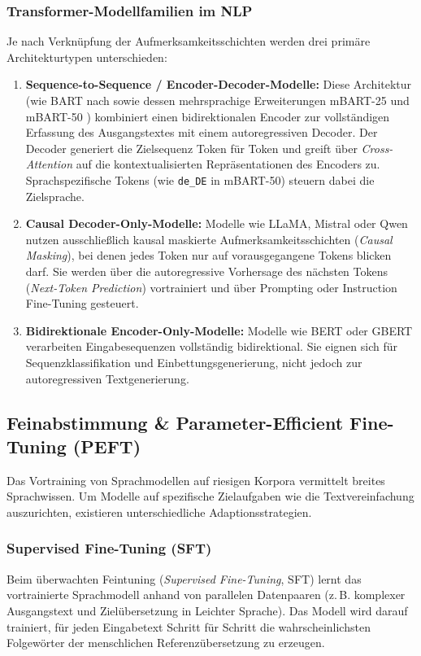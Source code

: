 \subsubsection{Transformer-Modellfamilien im NLP}
Je nach Verknüpfung der Aufmerksamkeitsschichten werden drei primäre Architekturtypen unterschieden:
\begin{enumerate}
    \item \textbf{Sequence-to-Sequence / Encoder-Decoder-Modelle:} Diese Architektur (wie BART nach \citet{lewis2020bart} sowie dessen mehrsprachige Erweiterungen mBART-25 \citep{liu2020multilingual} und mBART-50 \citep{tang2020multilingual}) kombiniert einen bidirektionalen Encoder zur vollständigen Erfassung des Ausgangstextes mit einem autoregressiven Decoder. Der Decoder generiert die Zielsequenz Token für Token und greift über \textit{Cross-Attention} auf die kontextualisierten Repräsentationen des Encoders zu. Sprachspezifische Tokens (wie \texttt{de\_DE} in mBART-50) steuern dabei die Zielsprache.
    \item \textbf{Causal Decoder-Only-Modelle:} Modelle wie LLaMA, Mistral oder Qwen nutzen ausschließlich kausal maskierte Aufmerksamkeitsschichten (\textit{Causal Masking}), bei denen jedes Token nur auf vorausgegangene Tokens blicken darf. Sie werden über die autoregressive Vorhersage des nächsten Tokens (\textit{Next-Token Prediction}) vortrainiert und über Prompting oder Instruction Fine-Tuning gesteuert.
    \item \textbf{Bidirektionale Encoder-Only-Modelle:} Modelle wie BERT \citep{devlin2019bert} oder GBERT verarbeiten Eingabesequenzen vollständig bidirektional. Sie eignen sich für Sequenzklassifikation und Einbettungsgenerierung, nicht jedoch zur autoregressiven Textgenerierung.
\end{enumerate}

\subsection{Feinabstimmung \& Parameter-Efficient Fine-Tuning (PEFT)}
\label{sec:peft_lora_theorie}

Das Vortraining von Sprachmodellen auf riesigen Korpora vermittelt breites Sprachwissen. Um Modelle auf spezifische Zielaufgaben wie die Textvereinfachung auszurichten, existieren unterschiedliche Adaptionsstrategien.

\subsubsection{Supervised Fine-Tuning (SFT)}
Beim überwachten Feintuning (\textit{Supervised Fine-Tuning}, SFT) lernt das vortrainierte Sprachmodell anhand von parallelen Datenpaaren (z.\,B. komplexer Ausgangstext und Zielübersetzung in Leichter Sprache). Das Modell wird darauf trainiert, für jeden Eingabetext Schritt für Schritt die wahrscheinlichsten Folgewörter der menschlichen Referenzübersetzung zu erzeugen.

